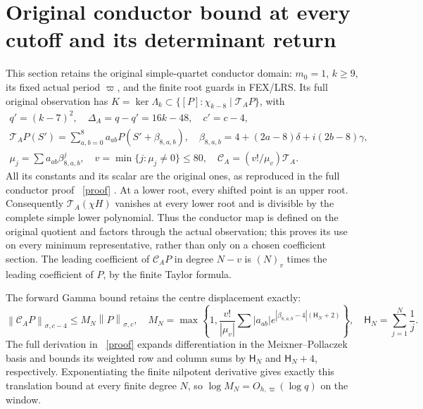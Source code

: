 \documentclass[11pt]{article}
\newcommand{\norm}[1]{\left\lVert#1\right\rVert}
\begin{document}
\section{Original conductor bound at every cutoff and its determinant return}
This section retains the original simple-quartet conductor domain:
$m_0=1$, $k\ge9$, its fixed actual period $\varpi$, and the finite root
guards in FEX/LRS. Its full original observation has
$K=\ker\Lambda_k\subset\{[P]:\chi_{k-8}\mid\mathcal T_AP\}$, with
\begin{equation}\tag{FW46}
 \begin{gathered}
 q'=(k-7)^2,\quad \Delta_A=q-q'=16k-48,\quad c'=c-4,\\
 \mathcal T_AP(S')=\sum_{a,b=0}^{8}a_{ab}P(S'+\beta_{8,a,b}),
 \quad \beta_{8,a,b}=4+(2a-8)\delta+i(2b-8)\gamma,\\
 \mu_j=\sum a_{ab}\beta_{8,a,b}^j,\quad
 v=\min\{j:\mu_j\ne0\}\le80,\quad
 \mathcal C_A=(v!/\mu_v)\mathcal T_A.
 \end{gathered}
\end{equation}
All its constants and its scalar are the original ones, as reproduced
in the full conductor proof \cite{oid}%
~\href{https://github.com/KokunoYumeto/zeta-function-research-reader/blob/487253b5b01851da5b9b98af4e146fecf1fab902/workbenches/splitzero-tandem/continuations/20260919-full-window-source-products/providers/ORE_INDEPENDENT_DERIVATION.tex\#L1}{[proof]}%
{}. At a lower root, every shifted
point is an upper root. Consequently $\mathcal T_A(\chi H)$ vanishes
at every lower root and is divisible by the complete simple lower
polynomial. Thus the conductor map is defined on the original quotient
and factors through the actual observation; this proves its use on every
minimum representative, rather than only on a chosen coefficient section.
The leading coefficient of $\mathcal C_AP$ in degree $N-v$ is
$(N)_v$ times the leading coefficient of $P$, by the finite Taylor formula.

The forward Gamma bound retains the centre displacement exactly:
\[
 \norm{\mathcal C_AP}_{\sigma,c-4}\le M_N\norm P_{\sigma,c},\quad
 M_N=\max\left\{1,\frac{v!}{|\mu_v|}\sum|a_{ab}|
             e^{|\beta_{8,a,b}-4|(\mathsf H_N+2)}\right\},\quad
 \mathsf H_N=\sum_{j=1}^N\frac1j.
\]
The full derivation in \cite{oid}%
~\href{https://github.com/KokunoYumeto/zeta-function-research-reader/blob/487253b5b01851da5b9b98af4e146fecf1fab902/workbenches/splitzero-tandem/continuations/20260919-full-window-source-products/providers/ORE_INDEPENDENT_DERIVATION.tex\#L1}{[proof]}%
{} expands differentiation in the
Meixner--Pollaczek basis and bounds its weighted row and column sums
by $\mathsf H_N$ and $\mathsf H_N+4$, respectively. Exponentiating the
finite nilpotent derivative gives exactly this translation bound at every
finite degree $N$, so $\log M_N=O_{h,\varpi}(\log q)$ on the window.
\end{document}

